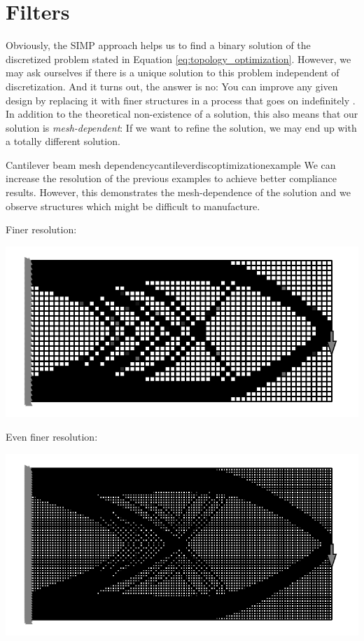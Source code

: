 \section{Filters}
Obviously, the SIMP approach helps us to find a binary solution of the discretized problem stated in Equation \eqref{eq:topology_optimization}. However, we may ask ourselves if there is a unique solution to this problem independent of discretization. And it turns out, the answer is no: You can improve any given design by replacing it with finer structures in a process that goes on indefinitely \cite{Christensen2008}. 
In addition to the theoretical non-existence of a solution, this also means that our solution is \emph{mesh-dependent}: If we want to refine the solution, we may end up with a totally different solution. 

\begin{example}{Cantilever beam mesh dependency}{cantileverdiscoptimizationexample}
    We can increase the resolution of the previous examples to achieve better compliance results. However, this demonstrates the mesh-dependence of the solution and we observe structures which might be difficult to manufacture.
    
    Finer resolution:
    \begin{center}
        \includegraphics[width=\linewidth]{figures/cantilever_fem_optimized_binary_fine.pdf}
    \end{center}
    
    Even finer resolution:
    \begin{center}
        \includegraphics[width=\linewidth]{figures/cantilever_fem_optimized_binary_extra_fine.pdf}
    \end{center}
\end{example}

